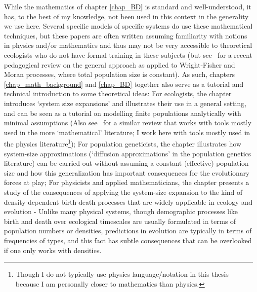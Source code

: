 While the mathematics of chapter \ref{chap_BD} is standard and well-understood, it has, to the best of my knowledge, not been used in this context in the generality we use here. Several specific models of specific systems do use these mathematical techniques, but these papers are often written assuming familiarity with notions in physics and/or mathematics and thus may not be very accessible to theoretical ecologists who do not have formal training in these subjects (but see~\cite{czuppon_understanding_2021} for a recent pedagogical review on the general approach as applied to Wright-Fisher and Moran processes, where total population size is constant). As such, chapters \ref{chap_math_background} and \ref{chap_BD} together also serve as a tutorial and technical introduction to some theoretical ideas: For ecologists, the chapter introduces `system size expansions' and illustrates their use in a general setting, and can be seen as a tutorial on modelling finite populations analytically with minimal assumptions (Also see~\cite{czuppon_understanding_2021} for a similar review that works with tools mostly used in the more `mathematical' literature; I work here with tools mostly used in the physics literature\footnote{Though I do not typically use physics language/notation in this thesis because I am personally closer to mathematics than physics.}); For population geneticists, the chapter illustrates how system-size approximations (`diffusion approximations' in the population genetics literature) can be carried out without assuming a constant (effective) population size and how this generalization has important consequences for the evolutionary forces at play; For physicists and applied mathematicians, the chapter presents a study of the consequences of applying the system-size expansion to the kind of density-dependent birth-death processes that are widely applicable in ecology and evolution - Unlike many physical systems, though demographic processes like birth and death over ecological timescales are usually formulated in terms of population numbers or densities, predictions in evolution are typically in terms of frequencies of types, and this fact has subtle consequences that can be overlooked if one only works with densities.


